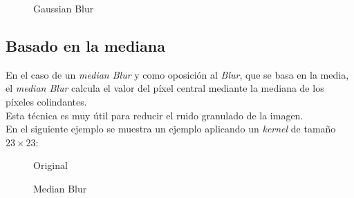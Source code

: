 \begin{figure}[H]
  \centering \setlength\fboxsep{0pt} \setlength\fboxrule{0.5pt}
  \caption{Gaussian Blur}
\end{figure}


\subsection{Basado en la mediana}\label{tecnica:blur-median}
En el caso de un \emph{median Blur} y como oposición al \emph{Blur},
que se basa en la media, el \emph{median Blur} calcula el valor
del píxel central mediante la mediana de los píxeles colindantes. \\
Esta técnica es muy útil para reducir el ruido granulado de la imagen.\\
En el siguiente ejemplo se muestra un ejemplo aplicando un
\emph{kernel} de tamaño $23 \times 23$:

\begin{figure}[H]
  \caption{Original}
  \centering \setlength\fboxsep{0pt} \setlength\fboxrule{0.5pt}
\end{figure}

\begin{figure}[H]
  \centering \setlength\fboxsep{0pt} \setlength\fboxrule{0.5pt}
  \caption{Median Blur}
\end{figure}

